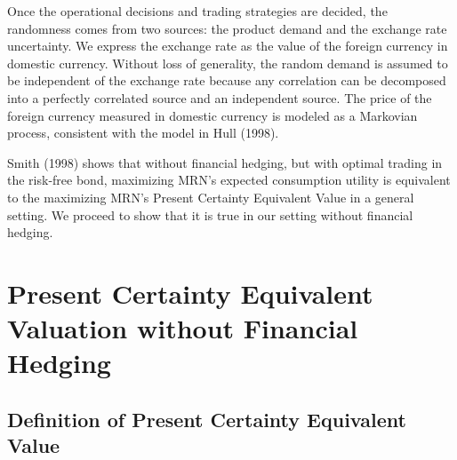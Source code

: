 \documentclass{article}[12pt letter]
\begin{document}
Once the operational decisions and trading strategies are decided, the randomness comes from two sources: the product demand and the exchange rate uncertainty. We express the exchange rate as the value of the foreign currency in domestic currency. Without loss of generality, the random demand is assumed to be independent of the exchange rate because any correlation can be decomposed into a perfectly correlated source and an independent source. The price of the foreign currency measured in domestic currency is modeled as a Markovian process, consistent with the model in Hull (1998).


Smith (1998) shows that without financial hedging, but with optimal trading in the risk-free bond, maximizing MRN's expected consumption utility is equivalent to the maximizing  MRN's Present Certainty Equivalent Value in a general setting. We proceed to show that it is true in our setting without financial hedging.

\section{Present Certainty Equivalent Valuation without Financial Hedging}


\subsection{Definition of Present Certainty Equivalent Value}
\end{document}
